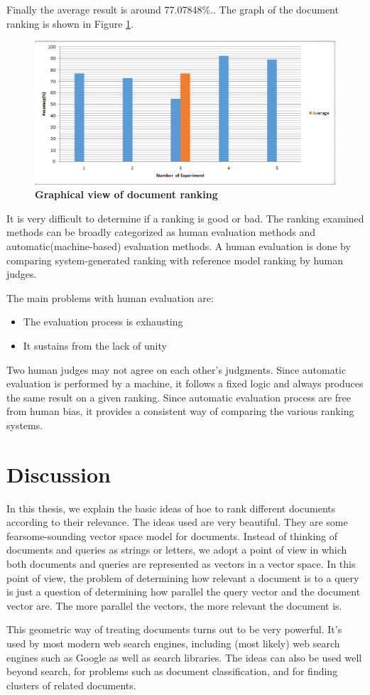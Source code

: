 Finally the average result is around 77.07848\%..
The graph of the document ranking is shown in Figure \ref{Figure:granking}.


\begin{figure}[htp]
	\centering
		\includegraphics[width=.65\textwidth]{figure/six.eps}
	\caption{\textbf{Graphical view of document ranking}}
	\label{Figure:granking}
\end{figure}


It is very difficult to determine if a ranking is good or bad. The ranking examined methods can be broadly categorized as human evaluation methods and automatic(machine-based) evaluation methods. A human evaluation is done by comparing system-generated ranking with reference model ranking by human judges.

The main problems with human evaluation are:

\begin{itemize}
	\item The evaluation process is exhausting
	\item It sustains from the lack of unity
\end{itemize}

Two human judges may not agree on each other’s judgments. Since automatic evaluation is performed by a machine, it follows a fixed logic and always produces the same result on a given ranking. Since automatic evaluation process are free from human bias, it provides a consistent way of comparing the various ranking systems.


\section{Discussion}

In this thesis, we explain the basic ideas of hoe to rank different documents according to their relevance. The ideas used are very beautiful. They are some fearsome-sounding vector space model for documents. Instead of thinking of documents and queries as strings or letters, we adopt a point of view in which both documents and queries are represented as vectors in a vector space. In this point of view, the problem of determining how relevant a document is to a query is just a question of determining how parallel the query vector and the document vector are. The more parallel the vectors, the more relevant the document is.

This geometric way of treating documents turns out to be very powerful. It’s used by most modern web search engines, including (most likely) web search engines such as Google as well as search libraries. The ideas can also be used well beyond search, for problems such as document classification, and for finding clusters of related documents.

